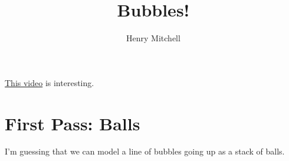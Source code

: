 \documentclass{article}
\author{Henry Mitchell}
\title{Bubbles!}
\begin{document}
\maketitle
\href{https://www.reddit.com/r/Damnthatsinteresting/comments/eibmnj/nebula_in_champagne/}{This video}
is interesting.

\section{First Pass: Balls}
I'm guessing that we can model a line of bubbles going up as a stack of balls.
\end{document}
